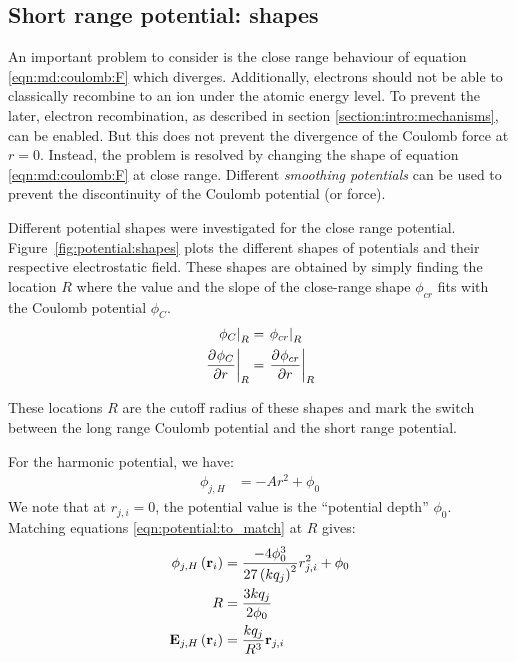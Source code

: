 \subsection{Short range potential: shapes}
\label{section:intro:md:potentials}

An important problem to consider is the close range behaviour of equation
\eqref{eqn:md:coulomb:F} which diverges. Additionally, electrons should not be
able to classically recombine to an ion under the atomic energy level. To
prevent the later, electron recombination, as described in section
\ref{section:intro:mechanisms}, can be enabled. But this does not prevent
the divergence of the Coulomb force at $r = 0$. Instead, the problem is resolved by
changing the shape of equation \eqref{eqn:md:coulomb:F} at close range.
Different \textit{smoothing potentials} can be used to prevent the
discontinuity of the Coulomb potential (or force).


Different potential shapes were investigated for the close range potential.
Figure~\ref{fig:potential:shapes} plots the different shapes of potentials and
their respective electrostatic field. These shapes are obtained by simply
finding the location $R$ where the value and the slope of the close-range shape
$\phi_{cr}$ fits with the Coulomb potential $\phi_C$.
\begin{subequations}
\begin{align}
\left. \phi_C        \right|_{R} & = \left. \phi_{cr} \right|_{R} \\
\left. \frac{\partial^{{}} \phi_C}{\partial r^{{}}} \right|_{R} & = \left. \frac{\partial^{{}} \phi_{cr}}{\partial r^{{}}} \right|_{R}
\end{align}
\label{eqn:potential:to_match}
\end{subequations}

These locations $R$ are the cutoff radius of these shapes and mark the switch
between the long range Coulomb potential and the short range potential.

For the harmonic potential, we have:
\begin{align}
\phi_{j,H} & = -A r^2 + \phi_0
\end{align}
We note that at $r_{j,i} = 0$, the potential value is the ``potential depth''
$\phi_0$.
Matching equations \eqref{eqn:potential:to_match} at $R$ gives:
\begin{subequations}
\begin{align}
\phi_{j,H}\left( \textbf{r}_i \right) & = \frac{-4 \phi_0^3}{27 \left( k q_j \right)^2} r_{j,i}^2 + \phi_0
\\
R & = \frac{3 k q_j}{2 \phi_0} \\
\textbf{E}_{j,H}\left( \textbf{r}_i \right) & = \frac{k q_j}{R^3} \textbf{r}_{j,i}
\end{align}
\end{subequations}


